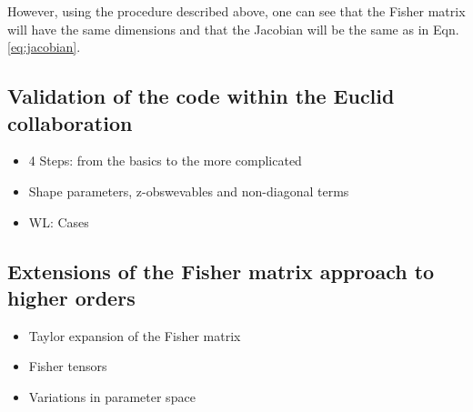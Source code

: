However, using the procedure described above, one can see that the
Fisher matrix will have the same dimensions and that the Jacobian
will be the same as in Eqn. \ref{eq:jacobian}.


%



\subsection{Validation of the code within the Euclid collaboration}
\begin{itemize}
\item 4 Steps: from the basics to the more complicated
\item Shape parameters, z-obswevables and non-diagonal terms
\item WL: Cases
\end{itemize}

\subsection{Extensions of the Fisher matrix approach to higher orders}
\begin{itemize}
\item Taylor expansion of the Fisher matrix
\item Fisher tensors
\item Variations in parameter space
\end{itemize}



